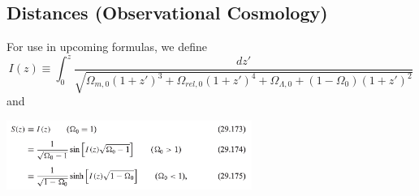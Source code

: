 \documentclass{book}
\begin{document}
\subsection{Distances (Observational Cosmology)}
For use in upcoming formulas, we define
\begin{equation*}
    I(z) \equiv \int_0^z \frac{dz'}{\sqrt{\Omega_{m,0} (1+z')^3 + \Omega_{rel,0} (1+z')^4 + \Omega_{\Lambda,0} + (1 - \Omega_0)(1 + z')^2}} \tag{C\&O 29.168}
\end{equation*}
and
\begin{center}
    \includegraphics[width = 0.6\textwidth]{images/s_of_z.png}
\end{center}
\end{document}
